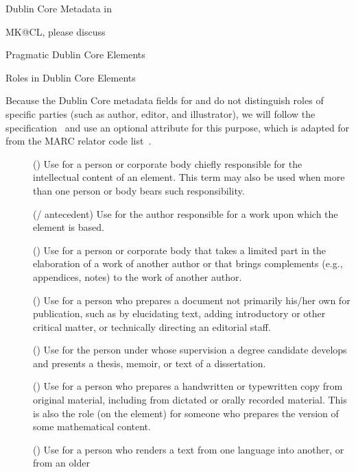 \begin{module}[id=dc-elements]
\begin{omgroup}[id=dc-elements]{Dublin Core Metadata in \omdoc}
\begin{newpart}{MK@CL, please discuss}
\begin{omgroup}{Pragmatic Dublin Core Elements}
\begin{omgroup}[id=dc-roles]{Roles in Dublin Core Elements}

Because the Dublin Core metadata fields for  and
 do not distinguish roles of specific parties (such as
author, editor, and illustrator), we will follow the {}
specification~\cite{OpenEBook:oeps99} and use an optional 
attribute for this purpose, which is adapted for \omdoc from the MARC relator code
list~\cite{Marc:relators03}.
\begin{description}
\item[{}] ({}) Use for a
  person or corporate body chiefly responsible for the intellectual
  content of an element. This term may also be used when more than one person or body
  bears such responsibility.
\item[{}]
  (/
  antecedent) Use for the author responsible for a work upon which the element is based.
\item[{}] ({}) Use
  for a person or corporate body that takes a limited part in the elaboration of a
  work of another author or that brings complements (e.g., appendices, notes) to
  the work of another author.
\item[{}] ({}) Use for a
  person who prepares a document not primarily his/her own for publication, such
  as by elucidating text, adding introductory or other critical matter, or
  technically directing an editorial staff.
\item[{}] ({}) Use for the person under
  whose supervision a degree candidate develops and presents a thesis, memoir, or text of
  a dissertation.
\item[{}] ({}) Use
  for a person who prepares a handwritten or typewritten copy from original
  material, including from dictated or orally recorded material. This is also the
  role (on the  element) for someone who prepares the \omdoc
  version of some mathematical content.
\item[{}] ({}) Use
  for a person who renders a text from one language into another, or from an older

\end{description}
\end{omgroup}
\end{omgroup}
\end{newpart}
\end{omgroup}
\end{module}
